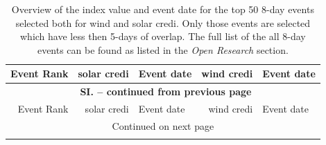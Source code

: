 \documentclass[12pt]{iopart}
\newcommand{\sdi}[0]{{\sc solar credi}}
\newcommand{\wdi}[0]{{\sc wind credi}}
\renewcommand\thetable{SI.\arabic{table}}
\begin{document}
\begin{longtable}{|r|rl|rl|}
\caption{
    Overview of the index value and event date for the top 50 8-day events selected both for {\sc wind} and \sdi{}. 
    Only those events are selected which have less then 5-days of overlap. 
    The full list of the all 8-day events can be found as listed in the \emph{Open Research} section.} \label{tab:Top50longtable} \\

\hline 
Event Rank & \sdi{} & Event date & \wdi{} & Event date  \\ \hline \hline
\endfirsthead

\multicolumn{5}{c}{{\bfseries \tablename\ \thetable{} -- continued from previous page}} \\ \hline
Event Rank & \sdi{} & Event date & \wdi{} & Event date  \\ \hline \hline
\endhead

\hline \multicolumn{5}{|c|}{{Continued on next page}} \\ \hline
\endfoot

\hline \hline
\endlastfoot


\end{longtable}
\end{document}
